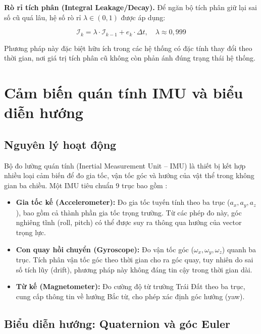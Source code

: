 \textbf{Rò rỉ tích phân (Integral Leakage/Decay).}
Để ngăn bộ tích phân giữ lại sai số cũ quá lâu, hệ số rò rỉ $\lambda \in (0, 1)$ được áp dụng:

\begin{equation}
    \mathcal{I}_k = \lambda \cdot \mathcal{I}_{k-1} + e_k \cdot \Delta t, \quad \lambda \approx 0{,}999
\end{equation}

Phương pháp này đặc biệt hữu ích trong các hệ thống có đặc tính thay đổi theo thời gian, nơi giá trị tích phân cũ không còn phản ánh đúng trạng thái hệ thống.

\section{Cảm biến quán tính IMU và biểu diễn hướng}

\subsection{Nguyên lý hoạt động}

Bộ đo lường quán tính (Inertial Measurement Unit -- IMU) là thiết bị kết hợp nhiều loại cảm biến để đo gia tốc, vận tốc góc và hướng của vật thể trong không gian ba chiều. Một IMU tiêu chuẩn 9 trục bao gồm \cite{madgwick2011}:

\begin{itemize}
    \item \textbf{Gia tốc kế (Accelerometer):} Đo gia tốc tuyến tính theo ba trục ($a_x, a_y, a_z$), bao gồm cả thành phần gia tốc trọng trường. Từ các phép đo này, góc nghiêng tĩnh (roll, pitch) có thể được suy ra thông qua hướng của vector trọng lực.

    \item \textbf{Con quay hồi chuyển (Gyroscope):} Đo vận tốc góc ($\omega_x, \omega_y, \omega_z$) quanh ba trục. Tích phân vận tốc góc theo thời gian cho ra góc quay, tuy nhiên do sai số tích lũy (drift), phương pháp này không đáng tin cậy trong thời gian dài.

    \item \textbf{Từ kế (Magnetometer):} Đo cường độ từ trường Trái Đất theo ba trục, cung cấp thông tin về hướng Bắc từ, cho phép xác định góc hướng (yaw).
\end{itemize}

\subsection{Biểu diễn hướng: Quaternion và góc Euler}

